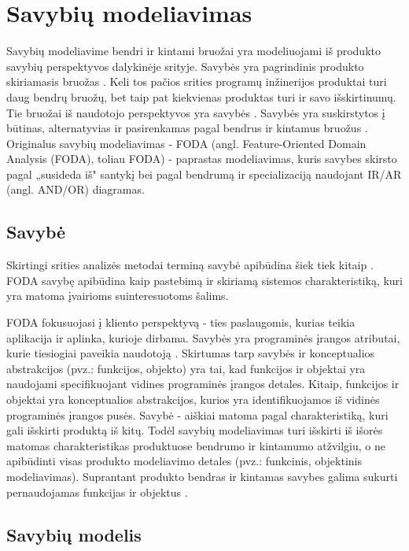 \documentclass{VUMIFPSbakalaurinis}
\begin{document}
\section{Savybių modeliavimas} \label{modeliavimas}

Savybių modeliavime bendri ir kintami bruožai yra modeliuojami iš produkto savybių perspektyvos dalykinėje srityje. Savybės yra pagrindinis produkto skiriamasis bruožas \cite{Lee2015}. Keli tos pačios srities programų inžinerijos produktai turi daug bendrų bruožų, bet taip pat kiekvienas produktas turi ir savo išskirtinumų. Tie bruožai iš naudotojo perspektyvos yra savybės \cite{Kang1990}. Savybės yra suskirstytos į būtinas, alternatyvias ir pasirenkamas pagal bendrus ir kintamus bruožus \cite{Kang2013}. Originalus savybių modeliavimas - FODA (angl. Feature-Oriented Domain Analysis (FODA), toliau FODA) \cite{Kang1990} - paprastas modeliavimas, kuris savybes skirsto pagal „susideda iš" santykį bei pagal bendrumą ir specializaciją naudojant IR/AR (angl. AND/OR)  diagramas.

\subsection{Savybė} \label{savybe}

Skirtingi srities analizės metodai terminą savybė apibūdina šiek tiek kitaip \cite{Lee2015}. FODA \cite{Kang1990} savybę apibūdina kaip pastebimą ir skiriamą sistemos charakteristiką, kuri yra matoma įvairioms suinteresuotoms šalims.

FODA fokusuojasi į kliento perspektyvą - ties paslaugomis, kurias teikia aplikacija ir aplinka, kurioje dirbama. Savybės yra programinės įrangos atributai, kurie tiesiogiai paveikia naudotoją \cite{Kang1990}. Skirtumas tarp savybės ir konceptualios abstrakcijos (pvz.: funkcijos, objekto) yra tai, kad funkcijos ir objektai yra naudojami specifikuojant vidines programinės įrangos detales. Kitaip, funkcijos ir objektai yra konceptualios abstrakcijos, kurios yra identifikuojamos iš vidinės programinės įrangos pusės. Savybė - aiškiai matoma  pagal charakteristiką, kuri gali išskirti produktą iš kitų. Todėl savybių modeliavimas turi išskirti iš išorės matomas charakteristikas produktuose bendrumo ir kintamumo atžvilgiu, o ne apibūdinti visas produkto modeliavimo detales (pvz.: funkcinis, objektinis modeliavimas). Suprantant produkto bendras ir kintamas savybes galima sukurti pernaudojamas funkcijas ir objektus \cite{Lee2015}.

\subsection{Savybių modelis}
\end{document}
